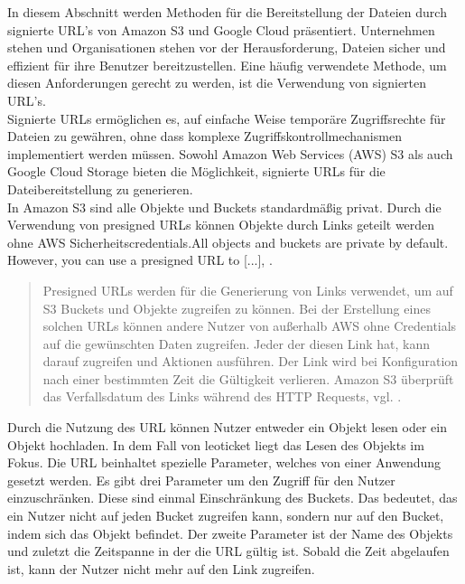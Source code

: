 In diesem Abschnitt werden Methoden für die Bereitstellung der Dateien durch signierte URL's von Amazon S3 und Google Cloud präsentiert. Unternehmen stehen und Organisationen stehen vor der Herausforderung, Dateien sicher und effizient für ihre Benutzer bereitzustellen. Eine häufig verwendete Methode, um diesen Anforderungen gerecht zu werden, ist die Verwendung von signierten URL's.\\

Signierte URLs ermöglichen es, auf einfache Weise temporäre Zugriffsrechte für Dateien zu gewähren, ohne dass komplexe Zugriffskontrollmechanismen implementiert werden müssen. Sowohl Amazon Web Services (AWS) S3 als auch Google Cloud Storage bieten die Möglichkeit, signierte URLs für die Dateibereitstellung zu generieren.\\

In Amazon S3 sind alle Objekte und Buckets standardmäßig privat. Durch die Verwendung von presigned URLs können Objekte durch Links geteilt werden ohne AWS Sicherheitscredentials.\glqq All objects and buckets are private by default. However, you can use a presigned URL to [...]\grqq, \cite{aws-signed-urls}. 

\begin{quote}
	Presigned URLs werden für die Generierung von Links verwendet, um auf S3 Buckets und Objekte zugreifen zu können. Bei der Erstellung eines solchen URLs können andere Nutzer von außerhalb AWS ohne Credentials auf die gewünschten Daten zugreifen. Jeder der diesen Link hat, kann darauf zugreifen und Aktionen ausführen. Der Link wird bei Konfiguration nach einer bestimmten Zeit die Gültigkeit verlieren. Amazon S3 überprüft das Verfallsdatum des Links während des HTTP Requests, vgl. \cite{aws-signed-urls}. 
\end{quote}

Durch die Nutzung des URL können Nutzer entweder ein Objekt lesen oder ein Objekt hochladen. In dem Fall von leoticket liegt das Lesen des Objekts im Fokus. Die URL beinhaltet spezielle Parameter, welches von einer Anwendung gesetzt werden. Es gibt drei Parameter um den Zugriff für den Nutzer einzuschränken. Diese sind einmal Einschränkung des Buckets. Das bedeutet, das ein Nutzer nicht auf jeden Bucket zugreifen kann, sondern nur auf den Bucket, indem sich das Objekt befindet. Der zweite Parameter ist der Name des Objekts und zuletzt die Zeitspanne in der die URL gültig ist. Sobald die Zeit abgelaufen ist, kann der Nutzer nicht mehr auf den Link zugreifen.\\

